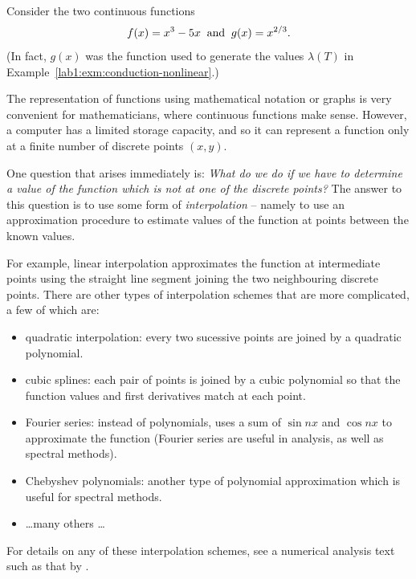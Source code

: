 \begin{example}
  Consider the two continuous functions 
  \[
    f(x)=x^3-5x \;\; {\rm and} \;\; g(x)=x^{2/3} . 
  \]
  (In fact, $g(x)$ was the function used to generate the values
  $\lambda(T)$ in Example~\ref{lab1:exm:conduction-nonlinear}.)

  The representation of functions using mathematical notation or
  graphs is very convenient for mathematicians, where continuous
  functions make sense.  However, a computer has a limited storage
  capacity, and so it can represent a function only at a finite number
  of discrete points $(x,y)$.

  One question that arises immediately is: \emph{What do we do if we
    have to determine a value of the function which is not at one of
    the discrete points?}  
  The answer to this question is to use some form of {\em
    interpolation} -- namely 
  to use an approximation procedure to estimate values of the function
  at points between the known values.
\begin{latexonly}
\end{latexonly}

  For example, linear interpolation approximates the function at
  intermediate points using the straight line segment joining the two
  neighbouring discrete points.
  There are other types of interpolation schemes that are more
  complicated, a few of which are:
  \begin{itemize}
  \item quadratic interpolation: every two sucessive points are joined
    by a quadratic polynomial.
  \item cubic splines: each pair of points is joined by a cubic
    polynomial so that the function values and first derivatives match
    at each point.
  \item Fourier series: instead of polynomials, uses a sum of 
    $\sin nx$ and $\cos nx$ to approximate the function (Fourier
    series are useful in analysis, as well as spectral methods).
  \item Chebyshev polynomials: another type of polynomial
    approximation which is useful for spectral methods.
  \item \dots many others \dots 
  \end{itemize}
  For details on any of these interpolation schemes, see a numerical
  analysis text such as that by \cite{burden-faires}.   


\end{example}
